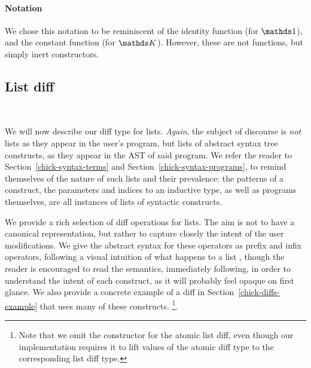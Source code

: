 \paragraph{Notation} We chose this notation to be reminiscent of the identity
function (for $\MathSame{}$), and the constant function (for
$\MathReplaceOp{}$).  However, these are not functions, but simply inert
constructors.

\subsection{List diff}~\label{list-diff}

We will now describe our diff type for lists.  \emph{Again}, the subject of
discourse is \emph{not} lists as they appear in the user's program, but lists of
abstract syntax tree constructs, as they appear in the AST of said program.  We
refer the reader to Section~\ref{chick-syntax-terms} and
Section~\ref{chick-syntax-programs}, to remind themselves of the nature of such
lists and their prevalence: the patterns of a  construct, the
parameters and indices to an inductive type, as well as programs themselves, are
all instances of lists of syntactic constructs.

We provide a rich selection of diff operations for lists.  The aim is not to
have a canonical representation, but rather to capture closely the intent of the
user modifications.  We give the abstract syntax for these operators as prefix
and infix operators, following a visual intuition of what happens to a list
, though the reader is encouraged to read the semantics,
immediately following, in order to understand the intent of each construct, as
it will probably feel opaque on first glance.  We also provide a concrete
example of a diff in Section~\ref{chick-diffs-example} that uses many of these
constructs.%
%
\footnote{Note that we omit the constructor for the atomic list diff, even
though our implementation requires it to lift values of the atomic diff type to
the corresponding list diff type.}.

